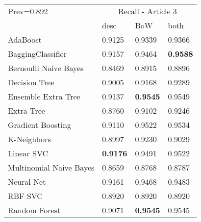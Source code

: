\begin{tabular}{|l|l|l|l| }
\hline
Prev=0.892 &  \multicolumn{3}{c|}{Recall - Article 3} \\
\cline{2-4} & desc & BoW & both \\ \hline
AdaBoost                & 0.9125 & 0.9339 & 0.9366\\
BaggingClassifier       & 0.9157 & 0.9464 & {\bf 0.9588}\\
Bernoulli Naive Bayes   & 0.8469 & 0.8915 & 0.8896\\
Decision Tree           & 0.9005 & 0.9168 & 0.9289\\
Ensemble Extra Tree     & 0.9137 & {\bf 0.9545} & 0.9549\\
Extra Tree              & 0.8760 & 0.9102 & 0.9246\\
Gradient Boosting       & 0.9110 & 0.9522 & 0.9534\\
K-Neighbors             & 0.8997 & 0.9230 & 0.9029\\
Linear SVC              & {\bf 0.9176} & 0.9491 & 0.9522\\
Multinomial Naive Bayes & 0.8659 & 0.8768 & 0.8787\\
Neural Net              & 0.9161 & 0.9468 & 0.9483\\
RBF SVC                 & 0.8920 & 0.8920 & 0.8920\\
Random Forest           & 0.9071 & {\bf 0.9545} & 0.9545\\
\hline
\end{tabular}